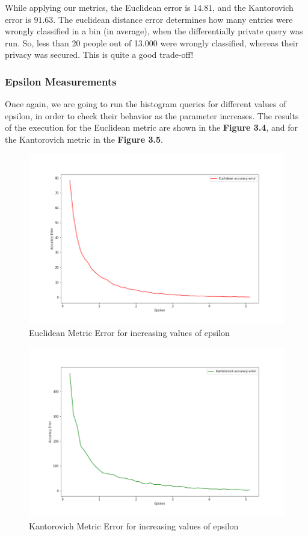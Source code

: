 While applying our metrics, the Euclidean error is $14.81$, and the Kantorovich error is $91.63$. The euclidean distance error determines how many entries were wrongly classified in a bin (in average), when the differentially private query was run. So, less than 20 people out of 13.000 were wrongly classified, whereas their privacy was secured. This is quite a good trade-off!

\subsubsection{Epsilon Measurements}

Once again, we are going to run the histogram queries for different values of epsilon, in order to check their behavior as the parameter increases. The results of the execution for the Euclidean metric are shown in the \textbf{Figure 3.4}, and for the Kantorovich metric in the \textbf{Figure 3.5}. 


\begin{figure}[!htb]\centering
    \includegraphics[width=1\textwidth]{images/hist_metrics_euclidean.png}
    \caption{Euclidean Metric Error for increasing values of epsilon}
\end{figure}

\begin{figure}[!htb]\centering
    \includegraphics[width=1\textwidth]{images/hist_metrics_kantorovich.png}
    \caption{Kantorovich Metric Error for increasing values of epsilon}
\end{figure}

